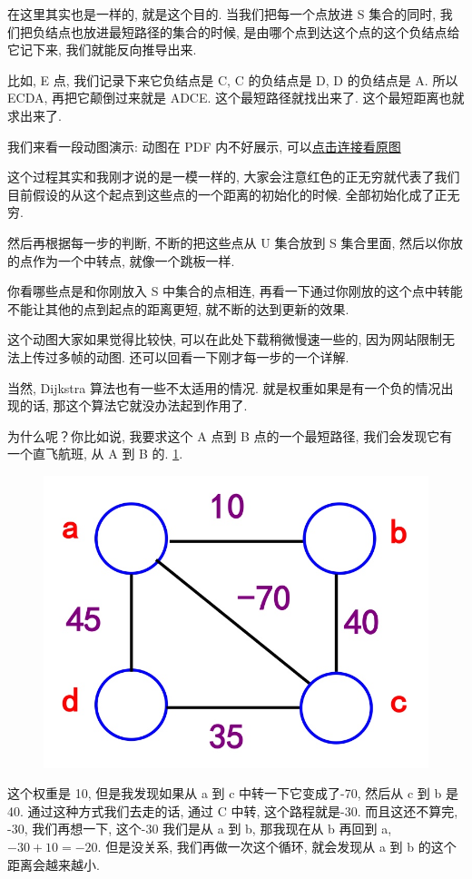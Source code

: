 在这里其实也是一样的, 就是这个目的. 当我们把每一个点放进 S 集合的同时, 我们把负结点也放进最短路径的集合的时候, 是由哪个点到达这个点的这个负结点给它记下来, 我们就能反向推导出来. 

比如, E 点, 我们记录下来它负结点是 C, C 的负结点是 D, D 的负结点是 A. 所以 ECDA, 再把它颠倒过来就是 ADCE. 这个最短路径就找出来了. 这个最短距离也就求出来了. 

我们来看一段动图演示: 动图在 PDF 内不好展示, 可以\href{https://raw.githubusercontent.com/hivandu/notes/main/img/20230924051227.gif}{点击连接看原图}

这个过程其实和我刚才说的是一模一样的, 大家会注意红色的正无穷就代表了我们目前假设的从这个起点到这些点的一个距离的初始化的时候. 全部初始化成了正无穷. 

然后再根据每一步的判断, 不断的把这些点从 U 集合放到 S 集合里面, 然后以你放的点作为一个中转点, 就像一个跳板一样. 

你看哪些点是和你刚放入 S 中集合的点相连, 再看一下通过你刚放的这个点中转能不能让其他的点到起点的距离更短, 就不断的达到更新的效果. 

这个动图大家如果觉得比较快, 可以在此处下载稍微慢速一些的, 因为网站限制无法上传过多帧的动图. 还可以回看一下刚才每一步的一个详解. 

当然, Dijkstra 算法也有一些不太适用的情况. 就是权重如果是有一个负的情况出现的话, 那这个算法它就没办法起到作用了. 

为什么呢？你比如说, 我要求这个 A 点到 B 点的一个最短路径, 我们会发现它有一个直飞航班, 从 A 到 B 的. \ref{fig:img26_9}. 

\begin{figure}[ht]
  \centering
  \includegraphics[width=0.4\linewidth]{asset/20230924051228.jpg}
  \caption{}
  \label{fig:img26_9}
\end{figure}

这个权重是 10, 但是我发现如果从 a 到 c 中转一下它变成了-70, 然后从 c 到 b 是 40. 通过这种方式我们去走的话, 通过 C 中转, 这个路程就是-30. 而且这还不算完, -30, 我们再想一下, 这个-30 我们是从 a 到 b, 那我现在从 b 再回到 a, $-30+10=-20$. 但是没关系, 我们再做一次这个循环, 就会发现从 a 到 b 的这个距离会越来越小. 

